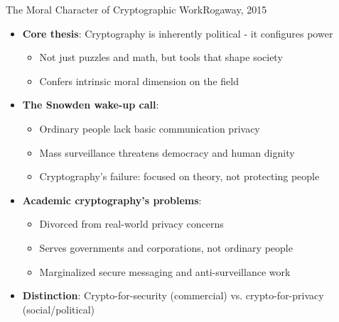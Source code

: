 \documentclass[aspectratio=169, lualatex, handout]{beamer}
\begin{document}
\begin{frame}{The Moral Character of Cryptographic Work}{Rogaway, 2015}
	\begin{itemize}
		\item \textbf{Core thesis}: Cryptography is inherently political - it configures power
		      \begin{itemize}
			      \item Not just puzzles and math, but tools that shape society
			      \item Confers intrinsic moral dimension on the field
		      \end{itemize}
		\item \textbf{The Snowden wake-up call}:
		      \begin{itemize}
			      \item Ordinary people lack basic communication privacy
			      \item Mass surveillance threatens democracy and human dignity
			      \item Cryptography's failure: focused on theory, not protecting people
		      \end{itemize}
		\item \textbf{Academic cryptography's problems}:
		      \begin{itemize}
			      \item Divorced from real-world privacy concerns
			      \item Serves governments and corporations, not ordinary people
			      \item Marginalized secure messaging and anti-surveillance work
		      \end{itemize}
		\item \textbf{Distinction}: Crypto-for-security (commercial) vs. crypto-for-privacy (social/political)
	\end{itemize}
\end{frame}
\end{document}
